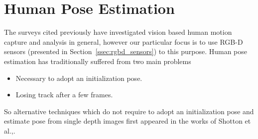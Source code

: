 %
\section{Human Pose Estimation}
\label{sec:humanpose}
  The surveys\cite{Moeslund2001231}\cite{Moeslund200690}\cite{Poppe20074} cited previously have investigated vision based human motion capture and analysis in general, however our particular focus is to use RGB-D sensors (presented in Section~\ref{ssec:rgbd_sensors}) to this purpose. Human pose estimation has traditionally suffered from two main problems
\begin{itemize}
\item Necessary to adopt an initialization pose.
\item Losing track after a few frames.
\end{itemize}
So alternative techniques which do not require to adopt an initialization pose and estimate pose from single depth images first appeared in the works of Shotton et al.,\cite{Shotton2011}.
